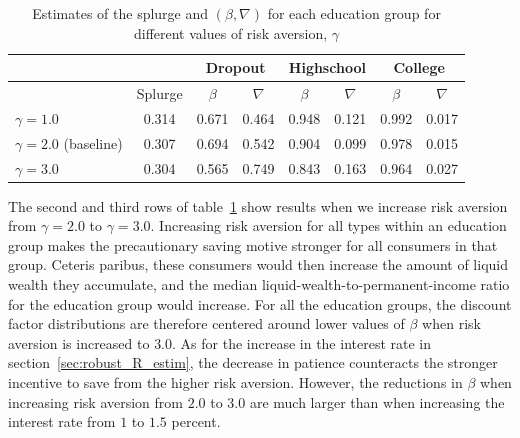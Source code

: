 \documentclass[../HAFiscal]{subfiles}
\begin{document}
\begin{table}[t]
\begin{center}
\begin{tabular}{lc|cccccc} 
	\toprule
	& & \multicolumn{2}{c}{Dropout} & \multicolumn{2}{c}{Highschool} & \multicolumn{2}{c}{College} \\ \midrule 
	& Splurge & $\beta$ & $\nabla$ & $\beta$ & $\nabla$ & $\beta$ & $\nabla$ \\ \midrule 
	$\gamma = 1.0$ & 0.314 & 0.671 & 0.464 & 0.948 & 0.121 & 0.992 & 0.017 \\ 
	$\gamma = 2.0$ (baseline) & 0.307 & 0.694 & 0.542 & 0.904 & 0.099 & 0.978 & 0.015 \\
	$\gamma = 3.0$ & 0.304 & 0.565 & 0.749 & 0.843 & 0.163 & 0.964 & 0.027 
	\\ \bottomrule 
\end{tabular}
\caption{Estimates of the splurge and $(\beta,\nabla)$ for each education group for different values of risk aversion, $\gamma$}
\label{tab:robustness_gamma}
\end{center}
\end{table}

The second and third rows of table~\ref{tab:robustness_gamma} show results when we increase risk aversion from $\gamma=2.0$ to $\gamma=3.0$. Increasing risk aversion for all types within an education group makes the precautionary saving motive stronger for all consumers in that group. Ceteris paribus, these consumers would then increase the amount of liquid wealth they accumulate, and the median liquid-wealth-to-permanent-income ratio for the education group would increase. For all the education groups, the discount factor distributions are therefore centered around lower values of $\beta$ when risk aversion is increased to $3.0$. As for the increase in the interest rate in section~\ref{sec:robust_R_estim}, the decrease in patience counteracts the stronger incentive to save from the higher risk aversion. However, the reductions in $\beta$ when increasing risk aversion from $2.0$ to $3.0$ are much larger than when increasing the interest rate from $1$ to $1.5$ percent. 
\end{document}
